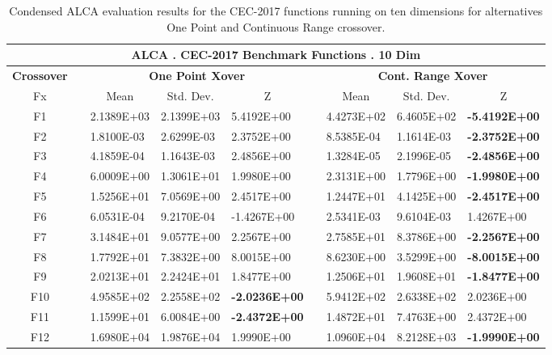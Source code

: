 \documentclass[graybox]{svmult}
\begin{document}
    \begin{table}[]
    \scriptsize
    \centering
    \caption{Condensed ALCA evaluation results for the CEC-2017 functions running on ten dimensions for alternatives One Point and Continuous Range crossover.}\label{tab.condensed_evaluation_10D}    
    \begin{tabular}{@{}cllllllll@{}}
    \toprule
    \multicolumn{9}{c}{\textbf{ALCA   . CEC-2017 Benchmark Functions . 10 Dim}} \\ \midrule
    \textbf{Crossover} & \textbf{} & \multicolumn{3}{c}{\textbf{One Point   Xover}} & \multicolumn{1}{c}{\textbf{}} & \multicolumn{3}{c}{\textbf{Cont. Range   Xover}} \\
    Fx &  & \multicolumn{1}{c}{Mean} & \multicolumn{1}{c}{Std. Dev.} & \multicolumn{1}{c}{Z} & \multicolumn{1}{c}{} & \multicolumn{1}{c}{Mean} & \multicolumn{1}{c}{Std. Dev.} & \multicolumn{1}{c}{Z} \\
    F1 &  & 2.1389E+03 & 2.1399E+03 & 5.4192E+00 &  & 4.4273E+02 & 6.4605E+02 & \textbf{-5.4192E+00} \\
    F2 &  & 1.8100E-03 & 2.6299E-03 & 2.3752E+00 &  & 8.5385E-04 & 1.1614E-03 & \textbf{-2.3752E+00} \\
    F3 &  & 4.1859E-04 & 1.1643E-03 & 2.4856E+00 &  & 1.3284E-05 & 2.1996E-05 & \textbf{-2.4856E+00} \\
    F4 &  & 6.0009E+00 & 1.3061E+01 & 1.9980E+00 &  & 2.3131E+00 & 1.7796E+00 & \textbf{-1.9980E+00} \\
    F5 &  & 1.5256E+01 & 7.0569E+00 & 2.4517E+00 &  & 1.2447E+01 & 4.1425E+00 & \textbf{-2.4517E+00} \\
    F6 &  & 6.0531E-04 & 9.2170E-04 & -1.4267E+00 &  & 2.5341E-03 & 9.6104E-03 & 1.4267E+00 \\
    F7 &  & 3.1484E+01 & 9.0577E+00 & 2.2567E+00 &  & 2.7585E+01 & 8.3786E+00 & \textbf{-2.2567E+00} \\
    F8 &  & 1.7792E+01 & 7.3832E+00 & 8.0015E+00 &  & 8.6230E+00 & 3.5299E+00 & \textbf{-8.0015E+00} \\
    F9 &  & 2.0213E+01 & 2.2424E+01 & 1.8477E+00 &  & 1.2506E+01 & 1.9608E+01 & \textbf{-1.8477E+00} \\
    F10 &  & 4.9585E+02 & 2.2558E+02 & \textbf{-2.0236E+00} &  & 5.9412E+02 & 2.6338E+02 & 2.0236E+00 \\
    F11 &  & 1.1599E+01 & 6.0084E+00 & \textbf{-2.4372E+00} &  & 1.4872E+01 & 7.4763E+00 & 2.4372E+00 \\
    F12 &  & 1.6980E+04 & 1.9876E+04 & 1.9990E+00 &  & 1.0960E+04 & 8.2128E+03 & \textbf{-1.9990E+00} \\

\end{tabular}
\end{table}
\end{document}
